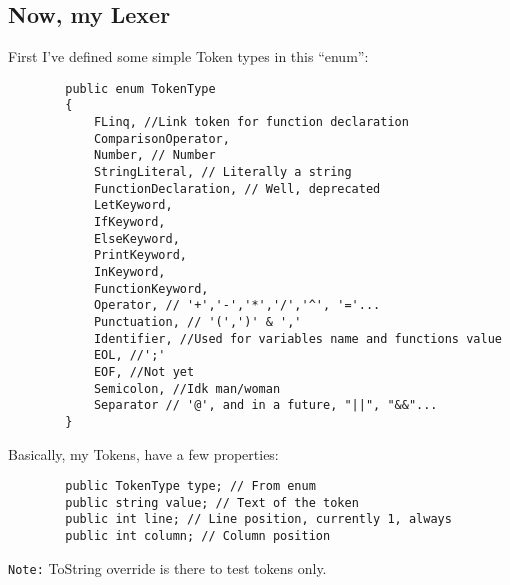 \subsection{Now, my Lexer}
    First I've defined some simple Token types in this ``enum'':
    \begin{lstlisting}
        public enum TokenType
        {
            FLinq, //Link token for function declaration
            ComparisonOperator,
            Number, // Number
            StringLiteral, // Literally a string
            FunctionDeclaration, // Well, deprecated
            LetKeyword, 
            IfKeyword, 
            ElseKeyword, 
            PrintKeyword, 
            InKeyword,
            FunctionKeyword,
            Operator, // '+','-','*','/','^', '='...
            Punctuation, // '(',')' & ','
            Identifier, //Used for variables name and functions value
            EOL, //';'
            EOF, //Not yet
            Semicolon, //Idk man/woman
            Separator // '@', and in a future, "||", "&&"...
        }
    \end{lstlisting}
    Basically, my Tokens, have a few properties:
    \begin{lstlisting}
        public TokenType type; // From enum
        public string value; // Text of the token
        public int line; // Line position, currently 1, always
        public int column; // Column position
    \end{lstlisting}
    \texttt{Note:} ToString override is there to test tokens only.

